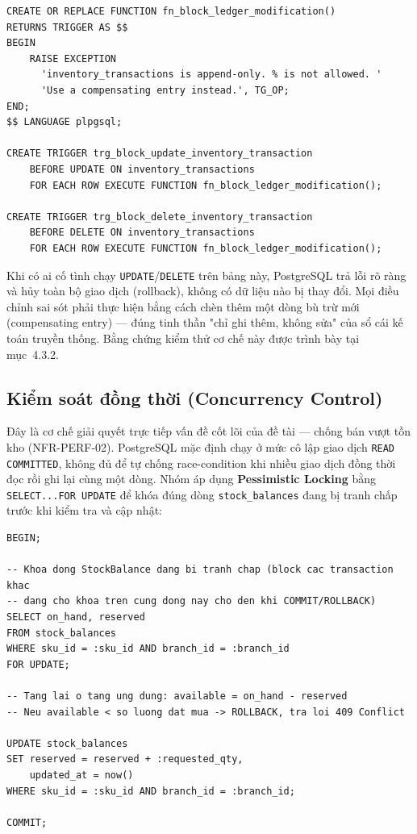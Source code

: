 \begin{lstlisting}
CREATE OR REPLACE FUNCTION fn_block_ledger_modification()
RETURNS TRIGGER AS $$
BEGIN
    RAISE EXCEPTION
      'inventory_transactions is append-only. % is not allowed. '
      'Use a compensating entry instead.', TG_OP;
END;
$$ LANGUAGE plpgsql;

CREATE TRIGGER trg_block_update_inventory_transaction
    BEFORE UPDATE ON inventory_transactions
    FOR EACH ROW EXECUTE FUNCTION fn_block_ledger_modification();

CREATE TRIGGER trg_block_delete_inventory_transaction
    BEFORE DELETE ON inventory_transactions
    FOR EACH ROW EXECUTE FUNCTION fn_block_ledger_modification();
\end{lstlisting}

Khi có ai cố tình chạy \texttt{UPDATE}/\texttt{DELETE} trên bảng này, PostgreSQL trả lỗi rõ ràng và hủy toàn bộ giao dịch (rollback), không có dữ liệu nào bị thay đổi. Mọi điều chỉnh sai sót phải thực hiện bằng cách chèn thêm một dòng bù trừ mới (compensating entry) — đúng tinh thần "chỉ ghi thêm, không sửa" của sổ cái kế toán truyền thống. Bằng chứng kiểm thử cơ chế này được trình bày tại mục~4.3.2.

\subsection{Kiểm soát đồng thời (Concurrency Control)}
\label{sec:concurrency-control}
Đây là cơ chế giải quyết trực tiếp vấn đề cốt lõi của đề tài — chống bán vượt tồn kho (NFR-PERF-02). PostgreSQL mặc định chạy ở mức cô lập giao dịch \texttt{READ COMMITTED}, không đủ để tự chống race-condition khi nhiều giao dịch đồng thời đọc rồi ghi lại cùng một dòng. Nhóm áp dụng \textbf{Pessimistic Locking} bằng \texttt{SELECT...FOR UPDATE} để khóa đúng dòng \texttt{stock\_balances} đang bị tranh chấp trước khi kiểm tra và cập nhật:

\begin{lstlisting}
BEGIN;

-- Khoa dong StockBalance dang bi tranh chap (block cac transaction khac
-- dang cho khoa tren cung dong nay cho den khi COMMIT/ROLLBACK)
SELECT on_hand, reserved
FROM stock_balances
WHERE sku_id = :sku_id AND branch_id = :branch_id
FOR UPDATE;

-- Tang lai o tang ung dung: available = on_hand - reserved
-- Neu available < so luong dat mua -> ROLLBACK, tra loi 409 Conflict

UPDATE stock_balances
SET reserved = reserved + :requested_qty,
    updated_at = now()
WHERE sku_id = :sku_id AND branch_id = :branch_id;

COMMIT;
\end{lstlisting}

